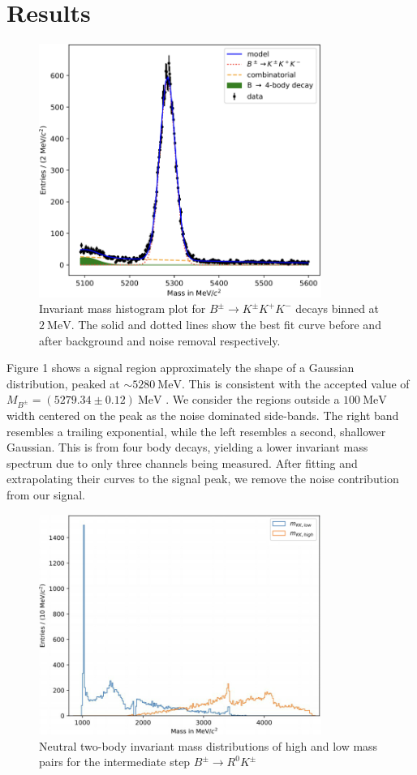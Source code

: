 \documentclass[11pt, twocolumn]{article}
\begin{document}
\section{Results}
\begin{figure}[htp]
    \centering
    \includegraphics[width=9.2cm]{graph1.png}
    \caption{Invariant mass histogram plot for $B^{\pm} \rightarrow K^{\pm}K^{+}K^{-}$ decays binned at  $2 \ \mathrm{MeV}$. The solid and dotted lines show the best fit curve before and after background and noise removal respectively.}
\end{figure}
Figure 1 shows a signal region approximately the shape of a Gaussian distribution, peaked at $\sim 5280 \ \mathrm{MeV}$. This is consistent with the accepted value of $M_{B^{\pm}} = (5279.34 \pm 0.12) \ \mathrm{MeV}$ \cite{Bplusminus}. We consider the regions outside a $100 \ \mathrm{MeV}$ width centered on the peak as the noise dominated side-bands. The right band resembles a trailing exponential, while the left resembles a second, shallower Gaussian. This is from four body decays, yielding a lower invariant mass spectrum due to only three channels being measured. After fitting and extrapolating their curves to the signal peak, we remove the noise contribution from our signal.
 
\begin{figure}[htp]
    \centering
    \includegraphics[width=9.2cm]{graph2.png}
    \caption{Neutral two-body invariant mass distributions of high and low mass pairs for the intermediate step $B^{\pm} \rightarrow R^{0}K^{\pm}$}
\end{figure}
\end{document}
